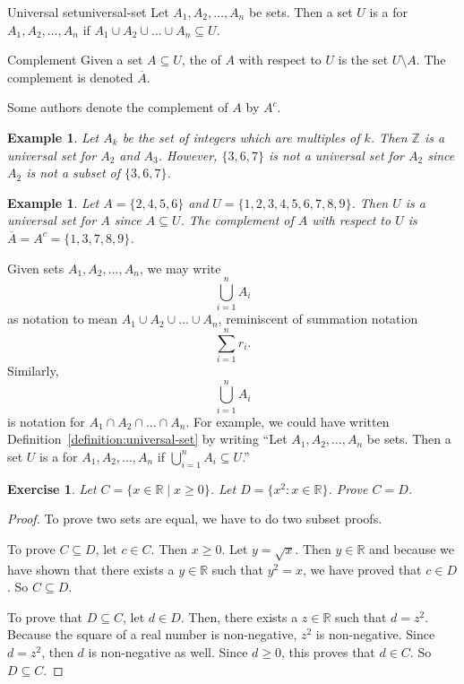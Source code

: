 \documentclass{book}
\newcounter{ekcounter}%
\theoremstyle{ekimcustom}
\newtheorem{example}[ekcounter]{Example}
\newtheorem{exercise}[ekcounter]{Exercise}
\newcommand\defn[1]{{\color{blue}{\bf #1}}}
\begin{document}
\begin{bdefinition}{Universal set}{universal-set}
Let $A_1,A_2,\dots, A_n$ be sets. Then a set $U$ is a \defn{universal set} for $A_1,A_2,\dots, A_n$ if $A_1 \cup A_2 \cup \dots \cup A_n \subseteq U$.
\end{bdefinition}
\begin{bdefinition}{Complement}{}
Given a set $A \subseteq U$, the \defn{complement} of $A$ with respect to $U$ is the set $U \setminus A$. The complement is denoted $\overline{A}$.
\end{bdefinition}
Some authors denote the complement of $A$ by $A^c$.
\begin{example}
Let $A_k$ be the set of integers which are multiples of $k$. Then $\mathbb{Z}$ is a universal set for $A_2$ and $A_3$. However, $\{3,6,7\}$ is not a universal set for $A_2$ since $A_2$ is not a subset of $\{3,6,7\}$.
\end{example}
\begin{example}
Let $A = \{2,4,5,6\}$ and $U = \{1,2,3,4,5,6,7,8,9\}$. Then $U$ is a universal set for $A$ since $A \subseteq U$. The complement of $A$ with respect to $U$ is $\overline{A}=A^c=\{1,3,7,8,9\}$.
\end{example}

Given sets $A_1, A_2,\dots, A_n$, we may write
\[ \bigcup_{i=1}^n A_i\]
as notation to mean $A_1 \cup A_2 \cup \dots \cup A_n$, reminiscent of summation notation
\[ \sum_{i=1}^n r_i.\]
Similarly, 
\[ \bigcup_{i=1}^n A_i\]
is notation for $A_1 \cap A_2 \cap \dots \cap A_n$. For example, we could have written Definition~\ref{definition:universal-set} by writing ``Let $A_1,A_2,\dots, A_n$ be sets. Then a set $U$ is a \defn{universal set} for $A_1,A_2,\dots, A_n$ if $\bigcup_{i=1}^n A_i \subseteq U$.''


\begin{exercise}
Let $C = \{x \in \mathbb{R} \mid x \geq 0\}$. Let $D = \{x^2 : x \in \mathbb{R}\}$. Prove $C=D$.
\end{exercise}
\begin{proof}
To prove two sets are equal, we have to do two subset proofs.

To prove $C \subseteq D$, let $c \in C$. Then $x \geq 0$. Let $y = \sqrt{x}$. Then $y \in \mathbb{R}$ and because we have shown that there exists a $y \in \mathbb{R}$ such that $y^2=x$, we have proved that $c \in D$. So $C \subseteq D$.

To prove that $D \subseteq C$, let $d \in D$. Then, there exists a $z \in \mathbb{R}$ such that $d=z^2$. Because the square of a real number is non-negative, $z^2$ is non-negative. Since $d=z^2$, then $d$ is non-negative as well. Since $d \geq 0$, this proves that $d \in C$. So $D \subseteq C$.
\end{proof}
\end{document}

